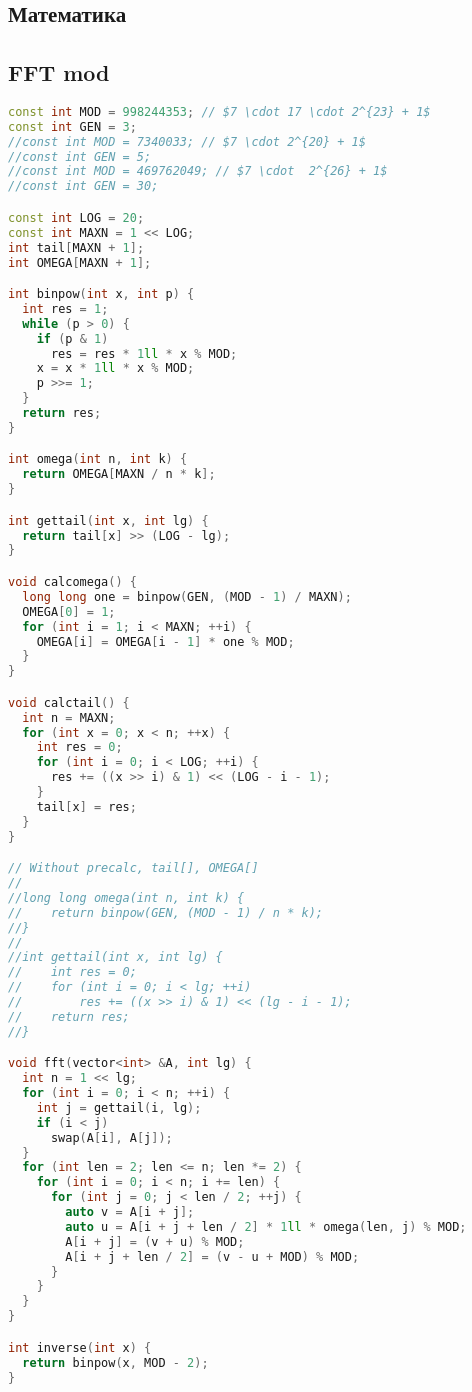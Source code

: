 \documentclass[10pt,a4paper,landscape,twosided]{extarticle}
\begin{document}
\begin{multicols*}{3}
\section{Математика}

\subsection{FFT mod}
\begin{lstlisting}[language=C++]
const int MOD = 998244353; // $7 \cdot 17 \cdot 2^{23} + 1$
const int GEN = 3;
//const int MOD = 7340033; // $7 \cdot 2^{20} + 1$
//const int GEN = 5;
//const int MOD = 469762049; // $7 \cdot  2^{26} + 1$
//const int GEN = 30;

const int LOG = 20;
const int MAXN = 1 << LOG;
int tail[MAXN + 1];
int OMEGA[MAXN + 1];

int binpow(int x, int p) {
  int res = 1;
  while (p > 0) {
    if (p & 1)
      res = res * 1ll * x % MOD;
    x = x * 1ll * x % MOD;
    p >>= 1;
  }
  return res;
}

int omega(int n, int k) {
  return OMEGA[MAXN / n * k];
}

int gettail(int x, int lg) {
  return tail[x] >> (LOG - lg);
}

void calcomega() {
  long long one = binpow(GEN, (MOD - 1) / MAXN);
  OMEGA[0] = 1;
  for (int i = 1; i < MAXN; ++i) {
    OMEGA[i] = OMEGA[i - 1] * one % MOD;
  }
}

void calctail() {
  int n = MAXN;
  for (int x = 0; x < n; ++x) {
    int res = 0;
    for (int i = 0; i < LOG; ++i) {
      res += ((x >> i) & 1) << (LOG - i - 1);
    }
    tail[x] = res;
  }
}

// Without precalc, tail[], OMEGA[]
//
//long long omega(int n, int k) {
//    return binpow(GEN, (MOD - 1) / n * k);
//}
//
//int gettail(int x, int lg) {
//    int res = 0;
//    for (int i = 0; i < lg; ++i)
//        res += ((x >> i) & 1) << (lg - i - 1);
//    return res;
//}

void fft(vector<int> &A, int lg) {
  int n = 1 << lg;
  for (int i = 0; i < n; ++i) {
    int j = gettail(i, lg);
    if (i < j)
      swap(A[i], A[j]);
  }
  for (int len = 2; len <= n; len *= 2) {
    for (int i = 0; i < n; i += len) {
      for (int j = 0; j < len / 2; ++j) {
        auto v = A[i + j];
        auto u = A[i + j + len / 2] * 1ll * omega(len, j) % MOD;
        A[i + j] = (v + u) % MOD;
        A[i + j + len / 2] = (v - u + MOD) % MOD;
      }
    }
  }
}

int inverse(int x) {
  return binpow(x, MOD - 2);
}


\end{lstlisting}
\end{multicols*}
\end{document}
